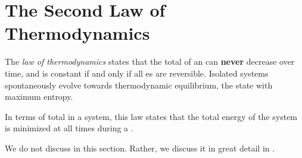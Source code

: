 \section{The Second Law of Thermodynamics}\label{sec:2nd_Law_Thermo}
\begin{definition}\label{def:2nd_Law_Thermo}
  The \emph{ law of thermodynamics} states that the total  of an  can \textbf{never} decrease over time, and is constant if and only if all es are reversible.
  Isolated systems spontaneously evolve towards thermodynamic equilibrium, the state with maximum entropy.

  In terms of total  in a system, this law states that the total energy of the system is minimized at all times during a .

  \begin{remark}
    We do not discuss  in this section.
    Rather, we discuss it in great detail in .
  \end{remark}
\end{definition}

